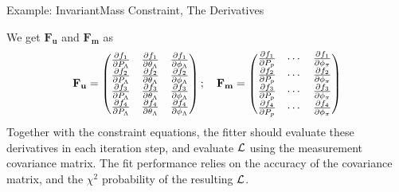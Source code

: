 \documentclass[
	xcolor=dvipsnames,
	aspectratio=169,	
	10pt, 
	]{beamer}
\begin{document}
\begin{frame}{Example: InvariantMass Constraint, The Derivatives}
	\begin{block}{}
		 We get $\mathbf{F_u}$ and $\mathbf{F_m}$ as
		\begin{align}
			\mathbf{F_u}=
			\begin{pmatrix}
				\frac{\partial f_1}{\partial P_\Lambda}&\frac{\partial f_1}{\partial \theta_\Lambda}&\frac{\partial f_1}{\partial \phi_\Lambda}\\
				\frac{\partial f_2}{\partial P_\Lambda}&\frac{\partial f_2}{\partial \theta_\Lambda}&\frac{\partial f_2}{\partial \phi_\Lambda}\\
				\frac{\partial f_3}{\partial P_\Lambda}&\frac{\partial f_3}{\partial \theta_\Lambda}&\frac{\partial f_3}{\partial \phi_\Lambda}\\
				\frac{\partial f_4}{\partial P_\Lambda}&\frac{\partial f_4}{\partial \theta_\Lambda}&\frac{\partial f_4}{\partial \phi_\Lambda}
			\end{pmatrix};\quad \mathbf{F_m}=\begin{pmatrix}
				\frac{\partial f_1}{\partial P_p} &\cdots&\frac{\partial f_1}{\partial \phi_\pi} \\
				\frac{\partial f_2}{\partial P_p} &\cdots&\frac{\partial f_2}{\partial \phi_\pi}\\
				\frac{\partial f_3}{\partial P_p} &\cdots&\frac{\partial f_3}{\partial \phi_\pi}\\
				\frac{\partial f_4}{\partial P_p} &\cdots&\frac{\partial f_4}{\partial \phi_\pi}
			\end{pmatrix}\label{InvMassConstDeriv}
		\end{align}
		Together with the constraint equations, the fitter should evaluate these derivatives in each iteration step, and evaluate $\mathcal{L}$ using the measurement covariance matrix.
		The fit performance relies on the accuracy of the covariance matrix, and the $\chi^2$ probability of the resulting $\mathcal{L}$.
	\end{block}
\end{frame}
\end{document}
